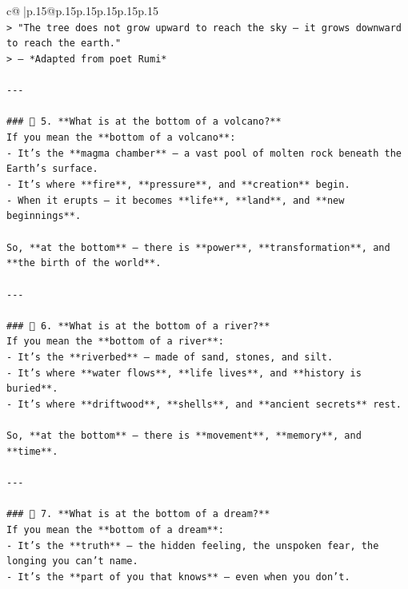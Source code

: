 \documentclass{article}
\begin{document}
{\begin{supertabular}{c@{$\;$}|p{.15\linewidth}@{}p{.15\linewidth}p{.15\linewidth}p{.15\linewidth}p{.15\linewidth}p{.15\linewidth}}
{{{\\ 
\texttt{> "The tree does not grow upward to reach the sky — it grows downward to reach the earth."  } \\
\texttt{> — *Adapted from poet Rumi*} \\
\\ 
\texttt{{-}{-}{-}} \\
\\ 
\texttt{\#\#\# 🌋 5. **What is at the bottom of a volcano?**} \\
\texttt{If you mean the **bottom of a volcano**:} \\
\texttt{{-} It’s the **magma chamber** — a vast pool of molten rock beneath the Earth’s surface.} \\
\texttt{{-} It’s where **fire**, **pressure**, and **creation** begin.} \\
\texttt{{-} When it erupts — it becomes **life**, **land**, and **new beginnings**.} \\
\\ 
\texttt{So, **at the bottom** — there is **power**, **transformation**, and **the birth of the world**.} \\
\\ 
\texttt{{-}{-}{-}} \\
\\ 
\texttt{\#\#\# 🌊 6. **What is at the bottom of a river?**} \\
\texttt{If you mean the **bottom of a river**:} \\
\texttt{{-} It’s the **riverbed** — made of sand, stones, and silt.} \\
\texttt{{-} It’s where **water flows**, **life lives**, and **history is buried**.} \\
\texttt{{-} It’s where **driftwood**, **shells**, and **ancient secrets** rest.} \\
\\ 
\texttt{So, **at the bottom** — there is **movement**, **memory**, and **time**.} \\
\\ 
\texttt{{-}{-}{-}} \\
\\ 
\texttt{\#\#\# 🌌 7. **What is at the bottom of a dream?**} \\
\texttt{If you mean the **bottom of a dream**:} \\
\texttt{{-} It’s the **truth** — the hidden feeling, the unspoken fear, the longing you can’t name.} \\
\texttt{{-} It’s the **part of you that knows** — even when you don’t.} \\
}}}
\end{supertabular}}
\end{document}
